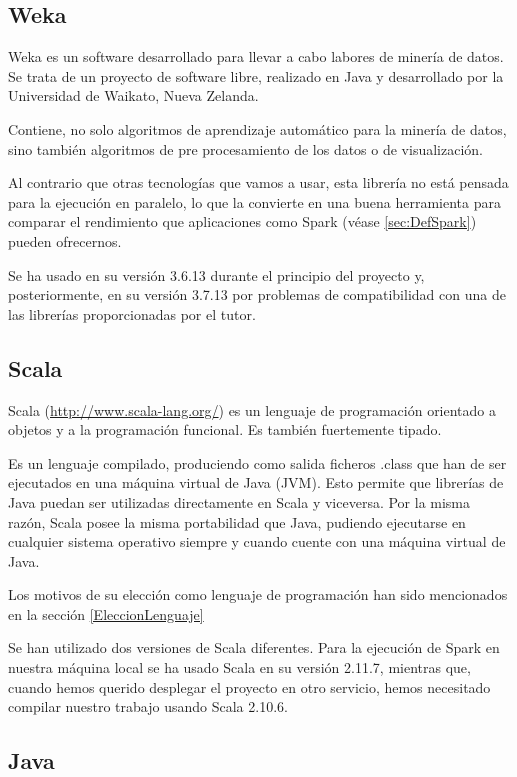 \subsection{Weka}\label{sec:DefWeka}
Weka \cite{WekaSoft} es un software desarrollado para llevar a cabo labores de minería de datos. Se trata de un proyecto de software libre, realizado en Java y desarrollado por la Universidad de Waikato, Nueva Zelanda.

Contiene, no solo algoritmos de aprendizaje automático para la minería de datos, sino también algoritmos de pre procesamiento de los datos o de visualización.

Al contrario que otras tecnologías que vamos a usar, esta librería no está pensada para la ejecución en paralelo, lo que la convierte en una buena herramienta para comparar el rendimiento que aplicaciones como Spark (véase \ref{sec:DefSpark}) pueden ofrecernos.

Se ha usado en su versión 3.6.13 durante el principio del proyecto y, posteriormente, en su versión 3.7.13 por problemas de compatibilidad con una de las librerías proporcionadas por el tutor.

\subsection{Scala}

Scala (\url{http://www.scala-lang.org/}) es un lenguaje de programación orientado a objetos y a la programación funcional. Es también fuertemente tipado.

Es un lenguaje compilado, produciendo como salida ficheros .class que han de ser ejecutados en una máquina virtual de Java (JVM). Esto permite que librerías de Java puedan ser utilizadas directamente en Scala y viceversa. Por la misma razón, Scala posee la misma portabilidad que Java, pudiendo ejecutarse en cualquier sistema operativo siempre y cuando cuente con una máquina virtual de Java. 

Los motivos de su elección como lenguaje de programación han sido mencionados en la sección \ref{EleccionLenguaje}

Se han utilizado dos versiones de Scala diferentes. Para la ejecución de Spark en nuestra máquina local se ha usado Scala en su versión 2.11.7, mientras que, cuando hemos querido desplegar el proyecto en otro servicio, hemos necesitado compilar nuestro trabajo usando Scala 2.10.6.

\subsection{Java}

